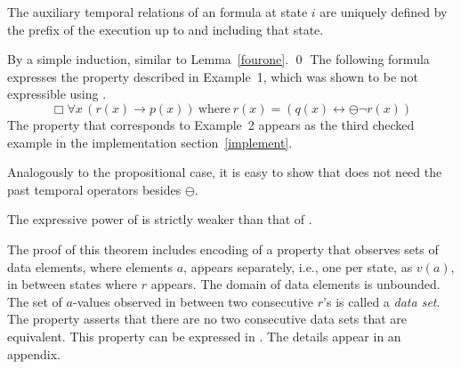 \begin{lemma} \label{samesame}
The auxiliary temporal relations of an \EFLTL{} formula 
at state $i$ are
uniquely defined by the prefix of the execution up to and including that state.
\end{lemma}
 By a simple induction, similar to Lemma~\ref{fourone}. \qed
\vspace{1ex}
The following formula expresses the property described in Example~1, which was shown to be 
not expressible using \FLTL{}.
\begin{equation}
\Box \forall x \, (r(x)\rightarrow p(x)) \mathrm{\ where\ }
r(x) = ( q(x) \leftrightarrow \ominus \neg  r(x)) 
\label{eq:wolper-first-order}
\end{equation}
The property that corresponds to Example~2 appears as the third checked example in the implementation section~\ref{implement}.




Analogously to the propositional case, it is easy to show that \EPFLTL{} does not
need the past temporal operators besides $\ominus$.





\begin{theorem}
\label{theo2}
The expressive power of \EPFLTL{} is strictly weaker than that of \QPFLTL{}.
\end{theorem}

The proof of this theorem includes encoding of a property that
observes sets of data elements, where 
elements $a$, appears separately, i.e., one per state, as
$v (a)$,
in between states where $r$ appears. The domain of data elements is unbounded.
The set of $a$-values observed in between two consecutive $r$'s is called a {\em data set}.
The property asserts that there are no two consecutive data sets that are equivalent.
This property can be expressed in \QPFLTL{}. The details appear in an appendix.

